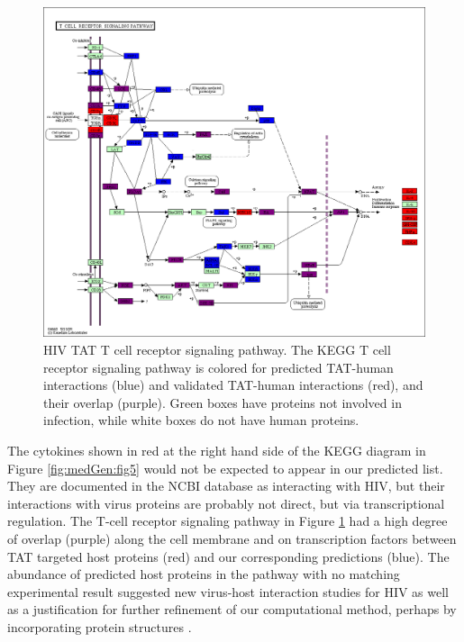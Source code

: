 \begin{figure}
\begin{center}
\includegraphics[scale=0.25]{figs/medGen_6}
\end{center}
\caption[HIV TAT T cell receptor signaling pathway]{\small HIV TAT T
  cell receptor signaling pathway. The KEGG T cell receptor signaling
  pathway is colored for predicted TAT-human interactions (blue) and
  validated TAT-human interactions (red), and their overlap
  (purple). Green boxes have proteins not involved in infection, while
  white boxes do not have human proteins. \label{fig:medGen:fig6}}
\end{figure}

The cytokines shown in red at the right hand side of the KEGG diagram
in Figure \ref{fig:medGen:fig5} would not be expected to appear in our
predicted list. They are documented in the NCBI database as interacting
with HIV, but their interactions with virus proteins are probably not
direct, but via transcriptional regulation. The T-cell receptor
signaling pathway in Figure \ref{fig:medGen:fig6} had a high degree of
overlap (purple) along the cell membrane and on transcription factors
between TAT targeted host proteins (red) and our corresponding
predictions (blue). The abundance of predicted host proteins in the
pathway with no matching experimental result suggested new virus-host
interaction studies for HIV as well as a justification for further
refinement of our computational method, perhaps by incorporating
protein structures \cite{doolittle2010structural}.

